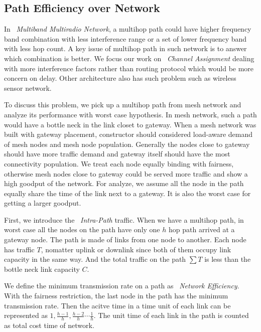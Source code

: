 \subsection{Path Efficiency over Network}
\label{subsec:PEN}

In ~\emph{Multiband Multiradio Network}, 
a multihop path could have higher frequency band combination with less interference range or a set of lower frequency band with less hop count.
A key issue of multihop path in such network is to answer which combination is better.
We focus our work on ~\emph{Channel Assignment} dealing with more interference factors rather than routing protocol which would be more concern on delay. Other architecture also has such problem such as wireless sensor network.

To discuss this problem, we pick up a multihop path from mesh network and analyze its performance with worst case hypothesis. In mesh network, such a path would have a bottle neck in the link closet to gateway.
When a mesh network was built with gateway placement, constructor should considered load-aware demand of mesh nodes and mesh node population. 
Generally the nodes close to gateway should have more traffic demand and gateway itself should have the most connectivity population. 
We treat each node equally binding with fairness, otherwise mesh nodes close to gateway could be served more traffic and show a high goodput of the network.
For analyze, we assume all the node in the path equally share the time of the link next to a gateway. It is also the worst case for getting a larger goodput.


First, we introduce the ~\emph{Intra-Path} traffic. When we have a multihop path, in worst case all the nodes on the path have only one $h$ hop path arrived at a gateway node. The path is made of links from one node to another.
Each node has traffic $T$, nomatter uplink or downlink since both of them occupy link capacity in the same way. And the total traffic on the path $\sum T$ is less than the bottle neck link capacity $C$. 

We define the minimum transmission rate on a path as ~\emph{Network Efficiency}. 
With the fairness restriction, the last node in the path has the minimum transmission rate.
Then the acitve time in a time unit of each link can be represented as $1,\frac{h-1}{h},\frac{h-2}{h}\cdots \frac{1}{h}$. 
The unit time of each link in the path is counted as total cost time of network.


